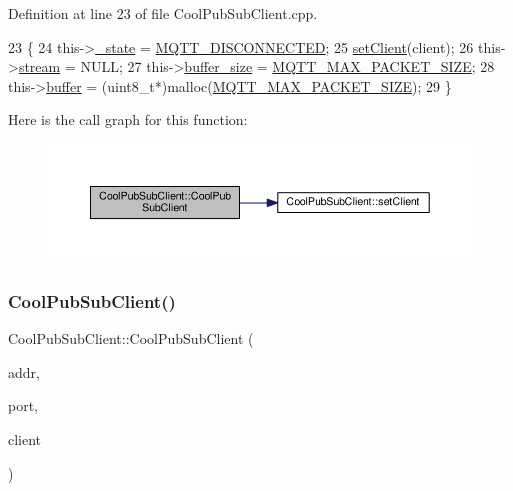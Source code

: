 Definition at line 23 of file Cool\+Pub\+Sub\+Client.\+cpp.


\begin{DoxyCode}
23                                                  \{
24     this->\hyperlink{class_cool_pub_sub_client_aa1953b601206252a30efa5b114eb3e1a}{\_state} = \hyperlink{_cool_pub_sub_client_8h_adaf86a906a305dd129164982d50111b3}{MQTT\_DISCONNECTED};
25     \hyperlink{class_cool_pub_sub_client_a7ee119b786010561ab6a9afa0798e91d}{setClient}(client);
26     this->\hyperlink{class_cool_pub_sub_client_a7a92417b317e7bd9502ed37752111705}{stream} = NULL;
27     this->\hyperlink{class_cool_pub_sub_client_ae6cb10e42c057483d53516ac830ab526}{buffer\_size} = \hyperlink{_cool_pub_sub_client_8h_ae09b594688a59f1427c7e45259e039b9}{MQTT\_MAX\_PACKET\_SIZE};
28     this->\hyperlink{class_cool_pub_sub_client_a7e8bcc6096626916046a51bebadc7851}{buffer} = (uint8\_t*)malloc(\hyperlink{_cool_pub_sub_client_8h_ae09b594688a59f1427c7e45259e039b9}{MQTT\_MAX\_PACKET\_SIZE});
29 \}
\end{DoxyCode}
Here is the call graph for this function\+:\nopagebreak
\begin{figure}[H]
\begin{center}
\leavevmode
\includegraphics[width=350pt]{d8/d4b/class_cool_pub_sub_client_a0563a12cb4e9339bf2605cfc655e717d_cgraph}
\end{center}
\end{figure}
\mbox{\label{class_cool_pub_sub_client_a4548ad6f306f6181e337a86c0b21a89a}} 
\subsubsection{\texorpdfstring{Cool\+Pub\+Sub\+Client()}{CoolPubSubClient()}\hspace{0.1cm}{\footnotesize\ttfamily [3/14]}}
{\footnotesize\ttfamily Cool\+Pub\+Sub\+Client\+::\+Cool\+Pub\+Sub\+Client (\begin{DoxyParamCaption}\item[{I\+P\+Address}]{addr,  }\item[{uint16\+\_\+t}]{port,  }\item[{Client \&}]{client }\end{DoxyParamCaption})}




